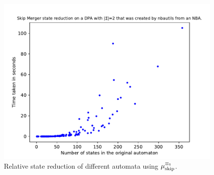 \begin{figure}
\begin{minipage}{0.49\textwidth}
		\includegraphics[page=2,height=.3\textheight]{../data/analysis/skipper/detnbaut_ap1.pdf} 
		\caption{Relative state reduction of different automata using $\mu_\text{skip}^{\equiv_\text{\Ankh}}$.}
		\label{fig:skip:empirical_reduct_abs}
	\end{minipage}
\end{figure}